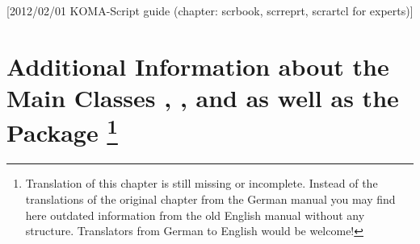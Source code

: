 %
%
%
%
%
%
%
%
% 
%
%
%
%

[2012/02/01 KOMA-Script guide
(chapter: scrbook, scrreprt, scrartcl for experts)]




\chapter{Additional Information about the Main Classes ,
  , and  as well as the Package
  \protect\footnote{Translation of this chapter is still
    missing or incomplete. Instead of the translations of the original chapter
    from the German manual you may find here outdated information from the old
    English manual without any structure. Translators from German to English
    would be welcome!}}

